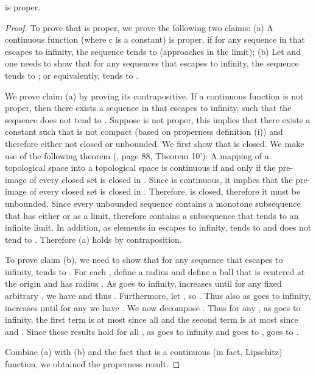 \documentclass[11pt]{myclass}
\begin{document}
\begin{lemma} 
 is proper. 
\label{lem:proper-app}
\end{lemma}
\begin{proof}
To prove that  is proper, we prove the following two claims: 
(a) A continuous function  (where c is a constant) is proper, if for any sequence  in  that escapes to infinity, the sequence 
 tends to  (approaches  in the limit);
(b) Let  and one needs to show that for any sequences  that escapes to infinity, the sequence  tends to ; or equivalently, 
 tends to .

We prove claim (a) by proving its contrapositive.   
If a continuous function  is not proper, then there exists a sequence  in  that escapes to infinity, such that the sequence  does not tend to . 
Suppose  is not proper, this implies that there exists a constant  such that  is not compact (based on properness definition (i)) and therefore either not closed or unbounded. 
We first show that  is closed. 
We make use of the following theorem (\cite{KolmogorovFominSilverman1975}, page 88, Theorem 10'):
A mapping  of a topological space  into a topological space  is continuous if and only if the pre-image  of every closed set  is closed in .  
Since  is continuous, it implies that the pre-image of every closed set  is closed in . Therefore,  is closed, therefore it must be unbounded.
Since every unbounded sequence contains a monotone subsequence
that has either  or  as a limit, 
therefore  contains a subsequence  that tends to an infinite limit. 
In addition, as elements in  escapes to infinity,  tends to  and does not tend to .
Therefore (a) holds by contraposition. 

To prove claim (b), we need to show that for any sequence  that escapes to infinity,  tends to .  
For each , define a radius  and define a ball  that is centered at the origin  and has radius .  As  goes to infinity,  increases until for any fixed arbitrary ,  we have  and thus .  Furthermore, let , so .  Thus also as  goes to infinity,  increases until for any  we have .  
We now decompose .  
Thus for any , as  goes to infinity, the first term is at most  since all  and the second term is at most  since  and .  
Since these results hold for all , as  goes to infinity and  goes to , 
 goes to .  

Combine (a) with (b) and the fact that  is a continuous (in fact, Lipschitz) function, we obtained the properness result. 
\end{proof}
\end{document}
